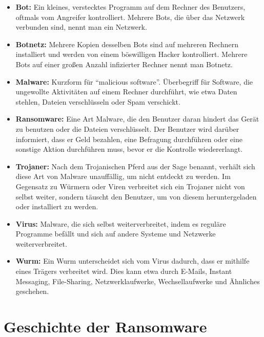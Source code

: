 		\begin{itemize}
			\item \textbf{Bot:} Ein kleines, verstecktes Programm auf dem Rechner des Benutzers, oftmals vom Angreifer kontrolliert. Mehrere Bots, die über das Netzwerk verbunden sind, nennt man ein Netzwerk.
			\item \textbf{Botnetz:} Mehrere Kopien desselben Bots sind auf mehreren Rechnern installiert und werden von einem böswilligen Hacker kontrolliert. Mehrere Bots auf einer großen Anzahl infizierter Rechner nennt man Botnetz.
			\item \textbf{Malware:}	Kurzform für ``malicious software''. Überbegriff für Software, die ungewollte Aktivitäten auf einem Rechner durchführt, wie etwa Daten stehlen, Dateien verschlüsseln oder Spam verschickt.
			\item \textbf{Ransomware:} Eine Art Malware, die den Benutzer daran hindert das Gerät zu benutzen oder die Dateien verschlüsselt. Der Benutzer wird darüber informiert, dass er Geld bezahlen, eine Befragung durchführen oder eine sonstige Aktion durchführen muss, bevor er die Kontrolle wiedererlangt.
			\item \textbf{Trojaner:} Nach dem Trojanischen Pferd aus der Sage benannt, verhält sich diese Art von Malware unauffällig, um nicht entdeckt zu werden. Im Gegensatz zu Würmern oder Viren verbreitet sich ein Trojaner nicht von selbst weiter, sondern täuscht den Benutzer, um von diesem heruntergeladen oder installiert zu werden.
			\item \textbf{Virus:} Malware, die sich selbst weiterverbreitet, indem es reguläre Programme befällt und sich auf andere Systeme und Netzwerke weiterverbreitet.
			\item \textbf{Wurm:} Ein Wurm unterscheidet sich vom Virus dadurch, dass er mithilfe eines Trägers verbreitet wird. Dies kann etwa durch E-Mails, Instant Messaging, File-Sharing, Netzwerklaufwerke, Wechsellaufwerke und Ähnliches geschehen.
		\end{itemize}

\section{Geschichte der Ransomware}
\label{sec:geschichte}
